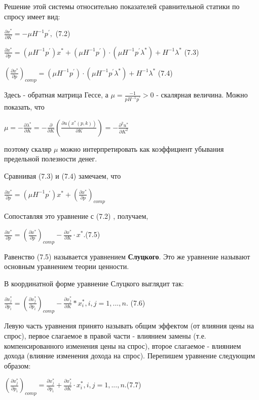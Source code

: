 \documentclass[12pt, 4paper]{book}
\begin{document}
{Решение этой системы относительно показателей сравнительной статики по спросу имеет вид: 
\begin{center}
$\frac{\partial x^{*}}{\partial K}= -\mu H^{-1}p^{'},$ (7.2)
\end{center}
\begin{center}
$\frac{\partial x^{*}}{\partial p}=(\mu H^{-1}p^{'})x^{*}+(\mu H^{-1}p^{'})\cdot (\mu H^{-1}p^{'}\lambda^{*})+H^{-1}\lambda^{*}$ (7.3)
\end{center}
\begin{center}
$(\frac{\partial x^{*}}{\partial p})_{comp}=(\mu H^{-1}p^{'})\cdot (\mu H^{-1}p^{'}\lambda^{*})+H^{-1}\lambda^{*}$ (7.4)
\end{center}
Здесь  - обратная матрица Гессе, а $\mu = \frac{-1}{pH^{-1}p^{'}}>0$
- скалярная величина. Можно показать, что 
\begin{center}
$\mu = -\frac{\partial \lambda^{*}}{\partial K}= -\frac{\partial}{\partial K}(\frac{\partial u(x^{*}(p,k))}{\partial K}) = -\frac{\partial^{2}u^{*}}{\partial K^{2}}$ 
\end{center}
поэтому скаляр $\mu$ можно интерпретировать как коэффициент убывания предельной полезности денег. 
\par

Сравнивая (7.3) и (7.4) замечаем, что 
\begin{center}
$\frac{\partial x^{*}}{\partial p}=(\mu H^{-1}p^{'})x^{*}+(\frac{\partial x^{*}}{\partial p})_{comp}$
\end{center}
Сопоставляя это уравнение с (7.2) , получаем, 
\begin{center}
$\frac{\partial x^{*}}{\partial p}=(\frac{\partial x^{*}}{\partial p})_{comp}-\frac{\partial x^{*}}{\partial K}\cdot x^{*}. $(7.5)
\end{center}
\par

Равенство (7.5) называется уравнением \textbf{Слуцкого}. Это же уравнение называют основным уравнением теории ценности. 
\par

В координатной форме уравнение Слуцкого выглядит так: 
\begin{center}
$\frac{\partial x_{j}^{*}}{\partial p_i}=(\frac{\partial x_{j}^{*}}{\partial p_i})_{comp}- \frac{\partial x_{j}^{*}}{\partial K}*x_{i}^{*},i,j=1,...,n.$ (7.6)
\end{center}
\par

Левую часть уравнения принято называть общим эффектом (от влияния цены на спрос), первое слагаемое в правой части - влиянием замены (т.е. компенсированного изменения цены на спрос), второе слагаемое - влиянием дохода (влияние изменения дохода на спрос). Перепишем уравнение следующим образом: 
\begin{center}
$(\frac{\partial x_{j}^{*}}{\partial p_i})_{comp}=\frac{\partial x_{j}^{*}}{\partial p_i}+\frac{\partial x_{j}^{*}}{\partial K}\cdot x_{i}^{*},i,j=1,...,n. $(7.7)
\end{center}
\par

}
\end{document}
